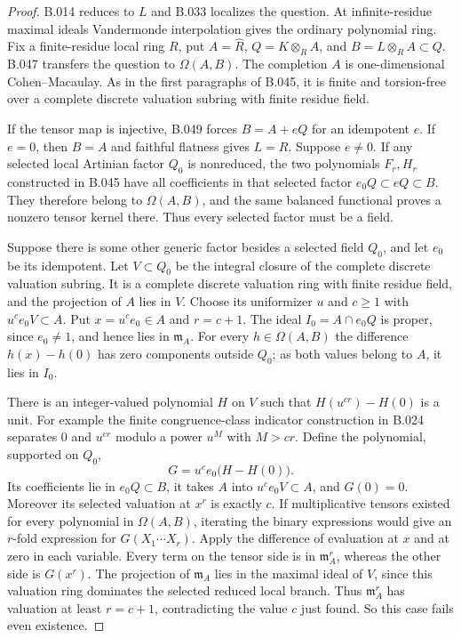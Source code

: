 \begin{proof}
B.014 reduces to $L$ and B.033 localizes the question.
At infinite-residue maximal ideals Vandermonde
interpolation gives the ordinary polynomial ring.
Fix a finite-residue local ring $R$, put
$A=\widehat R$, $Q=K\otimes_R A$, and
$B=L\otimes_R A\subset Q$. B.047 transfers the
question to $\Omega(A,B)$. The completion $A$ is
one-dimensional Cohen--Macaulay. As in the first
paragraphs of B.045, it is finite and torsion-free
over a complete discrete valuation subring with
finite residue field.

If the tensor map is injective, B.049 forces
$B=A+eQ$ for an idempotent $e$. If $e=0$, then
$B=A$ and faithful flatness gives $L=R$.
Suppose $e\ne0$. If any selected local Artinian
factor $Q_0$ is nonreduced, the two polynomials
$F_r,H_r$ constructed in B.045 have all coefficients
in that selected factor $e_0Q\subset eQ\subset B$.
They therefore belong to $\Omega(A,B)$, and the same
balanced functional proves a nonzero tensor kernel
there. Thus every selected factor must be a field.

Suppose there is some other generic factor besides
a selected field $Q_0$, and let $e_0$ be its
idempotent. Let $V\subset Q_0$ be the integral
closure of the complete discrete valuation subring.
It is a complete discrete valuation ring with finite
residue field, and the projection of $A$ lies in $V$.
Choose its uniformizer $u$ and $c\ge1$ with
$u^c e_0V\subset A$. Put $x=u^c e_0\in A$
and $r=c+1$.
The ideal $I_0=A\cap e_0Q$ is proper, since
$e_0\ne1$, and hence lies in $\mathfrak m_A$.
For every $h\in\Omega(A,B)$ the difference
$h(x)-h(0)$ has zero components outside $Q_0$;
as both values belong to $A$, it lies in $I_0$.

There is an integer-valued polynomial $H$ on $V$
such that $H(u^{cr})-H(0)$ is a unit. For example
the finite congruence-class indicator construction
in B.024 separates $0$ and $u^{cr}$ modulo a power
$u^M$ with $M>cr$. Define the polynomial, supported
on $Q_0$,
\[
                    G=u^c e_0\bigl(H-H(0)\bigr).
\]
Its coefficients lie in $e_0Q\subset B$, it takes
$A$ into $u^ce_0V\subset A$, and $G(0)=0$.
Moreover its selected valuation at $x^r$ is exactly
$c$. If multiplicative tensors existed for every
polynomial in $\Omega(A,B)$, iterating the binary
expressions would give an $r$-fold expression for
$G(X_1\cdots X_r)$. Apply the difference of evaluation
at $x$ and at zero in each variable. Every term on
the tensor side is in $\mathfrak m_A^r$, whereas
the other side is $G(x^r)$.
The projection of $\mathfrak m_A$ lies in the
maximal ideal of $V$, since this valuation ring
dominates the selected reduced local branch.
Thus $\mathfrak m_A^r$ has valuation at least
$r=c+1$, contradicting the value $c$ just found.
So this case fails even existence.


\end{proof}
